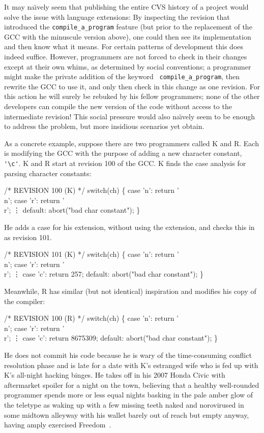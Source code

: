 \documentclass[twocolumn]{article}
\begin{document}
It may na\"\i{}vely seem that publishing the entire CVS history of a
project would solve the issue with language extensions: By inspecting
the revision that introduced the {\tt compile\_a\_program} feature
(but prior to the replacement of the GCC with the minuscule version
above), one could then see its implementation and then know what it
means. For certain patterns of development this does indeed suffice.
However, programmers are not forced to check in their changes except
at their own whims, as determined by social conventions; a programmer
might make the private addition of the keyword {\tt
compile\_a\_program}, then rewrite the GCC to use it, and only then
check in this change as one revision. For this action he will surely
be rebuked by his fellow programmers; none of the other developers can
compile the new version of the code without access to the intermediate
revision! This social pressure would also na\"\i{}vely seem to be enough
to address the problem, but more insidious scenarios yet obtain.

As a concrete example, suppose there are two programmers called K and
R. Each is modifying the GCC with the purpose of adding a new
character constant, \verb+'\c'+. K and R start at revision 100 of the
GCC. K finds the case analysis for parsing character constants:
%
\begin{code}
/* REVISION 100 (K) */
switch(ch) \{
  case 'n': return '\\n';
  case 'r': return '\\r';
  \vdots
  default: abort("bad char constant");
\}
\end{code}
%
He adds a case for his extension, without using the extension, and
checks this in as revision 101.
%
\begin{code}
/* REVISION 101 (K) */
switch(ch) \{
  case 'n': return '\\n';
  case 'r': return '\\r';
  \vdots
  case 'c': return 257;
  default: abort("bad char constant");
\}
\end{code}
%
Meanwhile, R has similar (but not identical) inspiration and modifies
his copy of the compiler:
%
\begin{code}
/* REVISION 100 (R) */
switch(ch) \{
  case 'n': return '\\n';
  case 'r': return '\\r';
  \vdots
  case 'c': return 8675309;
  default: abort("bad char constant");
\}
\end{code}
%
He does not commit his code because he is wary of the time-consuming
conflict resolution phase and is late for a date with K's estranged
wife who is fed up with K's all-night hacking binges. He takes off in
his 2007 Honda Civic with aftermarket spoiler for a
night on the town, believing that a healthy well-rounded programmer
spends more or less equal nights basking in the pale amber glow of the
teletype as waking up with a few missing teeth naked and norovirused
in some midtown alleyway with his wallet barely out of reach but empty
anyway, having amply exercised Freedom~\fbeer.
\end{document}
